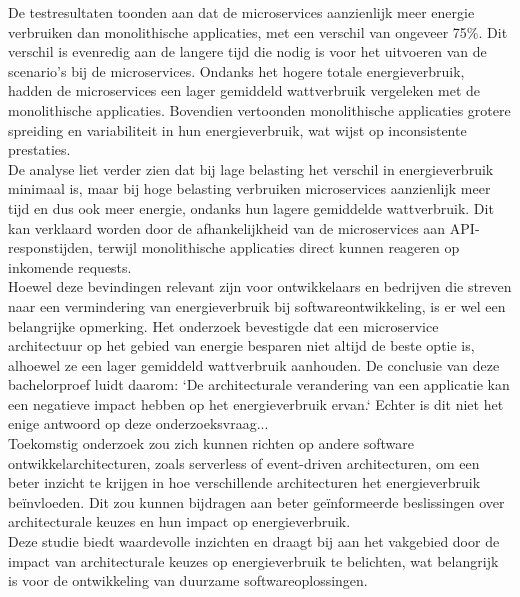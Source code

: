 De testresultaten toonden aan dat de microservices aanzienlijk meer energie verbruiken dan monolithische applicaties, met een verschil van ongeveer 75\%. Dit verschil is evenredig aan de langere tijd die nodig is voor het uitvoeren van de scenario’s bij de microservices. Ondanks het hogere totale energieverbruik, hadden de microservices een lager gemiddeld wattverbruik vergeleken met de monolithische applicaties. Bovendien vertoonden monolithische applicaties grotere spreiding en variabiliteit in hun energieverbruik, wat wijst op inconsistente prestaties.\\

De analyse liet verder zien dat bij lage belasting het verschil in energieverbruik minimaal is, maar bij hoge belasting verbruiken microservices aanzienlijk meer tijd en dus ook meer energie, ondanks hun lagere gemiddelde wattverbruik. Dit kan verklaard worden door de afhankelijkheid van de microservices aan API-responstijden, terwijl monolithische applicaties direct kunnen reageren op inkomende requests.\\

Hoewel deze bevindingen relevant zijn voor ontwikkelaars en bedrijven die streven naar een vermindering van energieverbruik bij softwareontwikkeling, is er wel een belangrijke opmerking. Het onderzoek bevestigde dat een microservice architectuur op het gebied van energie besparen niet altijd de beste optie is, alhoewel ze een lager gemiddeld wattverbruik aanhouden. De conclusie van deze bachelorproef luidt daarom: `De architecturale verandering van een applicatie kan een negatieve impact hebben op het energieverbruik ervan.` Echter is dit niet het enige antwoord op deze onderzoeksvraag...\\

Toekomstig onderzoek zou zich kunnen richten op andere software ontwikkelarchitecturen, zoals serverless of event-driven architecturen, om een beter inzicht te krijgen in hoe verschillende architecturen het energieverbruik beïnvloeden. Dit zou kunnen bijdragen aan beter geïnformeerde beslissingen over architecturale keuzes en hun impact op energieverbruik.\\

Deze studie biedt waardevolle inzichten en draagt bij aan het vakgebied door de impact van architecturale keuzes op energieverbruik te belichten, wat belangrijk is voor de ontwikkeling van duurzame softwareoplossingen.